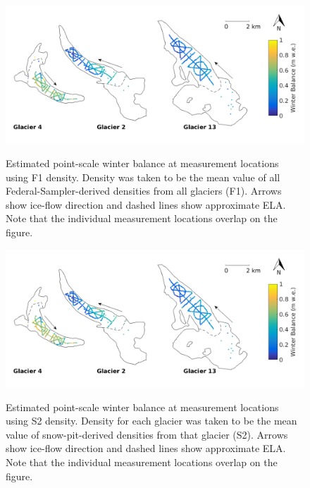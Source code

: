 \documentclass{sfuthesis}
\begin{document}
{\begin{figure}[H]
	\centering
	\includegraphics[width = \textwidth]{SWEmap_opt3.png}\\
	\caption[Estimated point-scale winter balance at measurement locations using F1 density]{Estimated point-scale winter balance at measurement locations using F1 density. Density was taken to be the mean value of all Federal-Sampler-derived densities from all glaciers (F1). Arrows show ice-flow direction and dashed lines show approximate ELA. Note that the individual measurement locations overlap on the figure.}
	\label{fig:SWEmap_F1}
\end{figure}

\begin{figure}[H]
	\centering
	\includegraphics[width =\textwidth]{SWEmap_opt4.png}\\
	\caption[Estimated point-scale winter balance at measurement locations using S2 density]{Estimated point-scale winter balance at measurement locations using S2 density. Density for each glacier was taken to be the mean value of snow-pit-derived densities from that glacier (S2). Arrows show ice-flow direction and dashed lines show approximate ELA. Note that the individual measurement locations overlap on the figure.}
	\label{fig:SWEmap_S2}
\end{figure}

}
\end{document}
